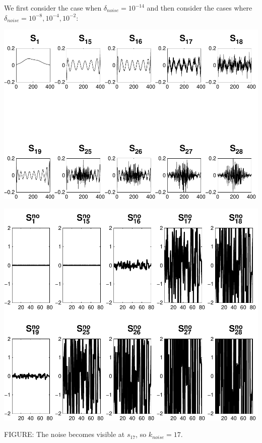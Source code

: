 \documentclass[11pt]{amsart}
\begin{document}
	We first consider the case when $\delta_{noise}=10^{-14}$ and then consider the cases
	where $\delta_{noise} = 10^{-8},10^{-4},10^{-2}$:


	\vspace{5mm}
	\begin{minipage}[t]{0.5\textwidth}
	
		\includegraphics[width=.95\linewidth]{figures/run1/sk_plots} 
   
	\end{minipage}
	\begin{minipage}[t]{0.5\textwidth}
	
		\includegraphics[width=.75\linewidth]{figures/run1/noise_parts} 
   
	\end{minipage}
	\begin{center}
		FIGURE: 
		The noise becomes visible at $s_{17}$, so $k_{noise} = 17$.
	\end{center} 
	\vspace{5mm}
\end{document}
